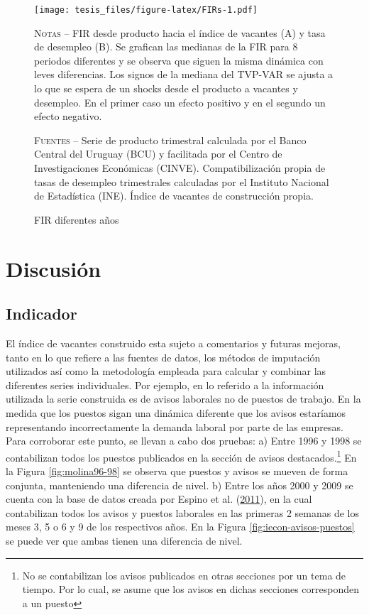 \documentclass[12pt,oneside]{reedthesis}
\makeatletter
\def\maxwidth{ %
  \ifdim\Gin@nat@width>\linewidth
    \linewidth
  \else
    \Gin@nat@width
  \fi
}
\makeatother
\begin{document}
\begin{figure}
\texttt{[image: tesis\_files/figure-latex/FIRs-1.pdf]}
\caption{FIR diferentes años}\label{fig:FIRs}\textsc{}

\footnotesize\textsc{Notas} -- FIR desde producto hacia el índice de vacantes (A) y tasa de desempleo (B). Se grafican las medianas de la FIR para 8 periodos diferentes y se observa que siguen la misma dinámica con leves diferencias. Los signos de la mediana del TVP-VAR se ajusta a lo que se espera de un shocks desde el producto a vacantes y desempleo. En el primer caso un efecto positivo y en el segundo un efecto negativo.

\textsc{Fuentes} -- Serie de producto trimestral calculada por el Banco Central del Uruguay (BCU) y facilitada por el Centro de Investigaciones Económicas (CINVE). Compatibilización propia de tasas de desempleo trimestrales calculadas por el Instituto Nacional de Estadística (INE). Índice de vacantes de construcción propia.
\end{figure}
\hypertarget{cap:Discusion}{%
\chapter{Discusión}\label{cap:Discusion}}

\hypertarget{indicador}{%
\section{Indicador}\label{indicador}}

El índice de vacantes construido esta sujeto a comentarios y futuras mejoras, tanto en lo que refiere a las fuentes de datos, los métodos de imputación utilizados así como la metodología empleada para calcular y combinar las diferentes series individuales. Por ejemplo, en lo referido a la información utilizada la serie construida es de avisos laborales no de puestos de trabajo. En la medida que los puestos sigan una dinámica diferente que los avisos estaríamos representando incorrectamente la demanda laboral por parte de las empresas. Para corroborar este punto, se llevan a cabo dos pruebas: a) Entre 1996 y 1998 se contabilizan todos los puestos publicados en la sección de avisos destacados.\footnote{No se contabilizan los avisos publicados en otras secciones por un tema de tiempo. Por lo cual, se asume que los avisos en dichas secciones corresponden a un puesto} En la Figura \ref{fig:molina96-98} se observa que puestos y avisos se mueven de forma conjunta, manteniendo una diferencia de nivel. b) Entre los años 2000 y 2009 se cuenta con la base de datos creada por Espino et al. (\protect\hyperlink{ref-Alma2011}{2011}), en la cual contabilizan todos los avisos y puestos laborales en las primeras 2 semanas de los meses 3, 5 o 6 y 9 de los respectivos años. En la Figura \ref{fig:iecon-avisos-puestos} se puede ver que ambas tienen una diferencia de nivel.
\end{document}
